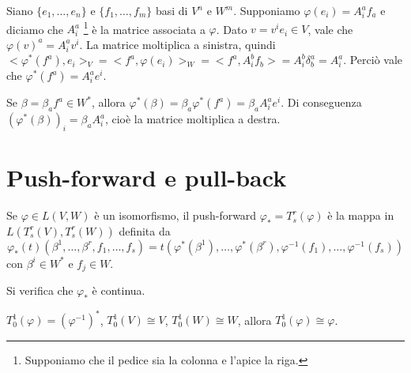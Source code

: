 Siano $\{e_1,\dots, e_n\}$ e $\{f_1,\dots, f_m\}$ basi di $V^n$ e $W^m$. Supponiamo $\varphi(e_i) = A_i^af_a$ e diciamo che $A_i^a$ \footnote{Supponiamo che il pedice sia la colonna e l'apice la riga.} è la matrice associata a $\varphi$. %
Dato $v = v^ie_i\in V$, vale che $\varphi(v)^a = A_i^a v^i$.
La matrice moltiplica a sinistra, quindi $<\varphi^*(f^a), e_i>_V = <f^a, \varphi(e_i)>_W = <f^a, A_i^b f_b> = A_i^b\delta_b^a = A_i^a$. Perciò vale che $\varphi^*(f^a) = A_i^a e^i$.

Se $\beta = \beta_a f^a \in W^*$, allora $\varphi^*(\beta) = \beta_a \varphi^*(f^a) = \beta_aA_i^ae^i$.
Di conseguenza $(\varphi^*(\beta))_i = \beta_aA_i^a$, cioè la matrice moltiplica a destra.

\section{Push-forward e pull-back}

\begin{definition}
	Se $\varphi \in L(V,W)$ è un isomorfismo, il push-forward $\varphi_* = T_s^r(\varphi)$ è la mappa in $L(T_s^r(V), T_s^r(W))$ definita da
	\begin{equation*}
		\varphi_*(t) (\beta^1,\dots,\beta^r,f_1,\dots,f_s) = t(\varphi^*(\beta^1),\dots,\varphi^*(\beta^r), \varphi^{-1}(f_1),\dots, \varphi^{-1}(f_s))
	\end{equation*}
	con $\beta^i\in W^*$ e $f_j\in W$.
\end{definition}

Si verifica che $\varphi_*$ è continua.

\begin{remark}
	$T_0^1(\varphi) = (\varphi^{-1})^*$, $T_0^1(V)\cong V$, $T_0^1(W)\cong W$, allora $T_0^1(\varphi)\cong\varphi$.
\end{remark}

